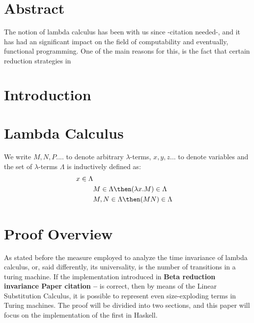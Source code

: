 \documentclass[12pt]{article}
\title{\bold{An analysis on the invariance of $\lambda$-calculus}}
\author{Haileselassie Gaspar}
\begin{document}
\maketitle

\section{Abstract}
The notion of lambda calculus has been with us since -citation needed-, and it has had an significant impact on the field of computability and eventually, functional
programming. One of the main reasons for this, is the fact that certain reduction strategies in
\section{Introduction}

\section{Lambda Calculus}
We write $M, N, P....$ to denote arbitrary $\lambda$-terms, $x,y,z...$ to denote variables and
the set of $\lambda$-terms $\Lambda$ is inductively defined as:
\begin{equation}
  \begin{aligned}
x \in \Lambda \\
  & M \in \Lambda \then (\lambda x.M) \in \Lambda \\
  & M, N \in \Lambda \then (MN) \in \Lambda
  \end{aligned}
\end{equation}

\section{Proof Overview}
As stated before the measure employed to analyze the time invariance of lambda calculus, or, said differently, its universality, is the number of transitions in a turing machine. If the implementation introduced in \textbf{Beta reduction invariance Paper citation --} is correct, then by means of the Linear Substitution Calculus, it is possible to represent even size-exploding terms in Turing machines. The proof will be dividied into two sections, and this paper will focus on the implementation of the first in Haskell.
\end{document}
